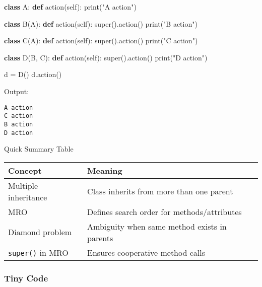 \documentclass[
  letterpaper,
  DIV=11,
  numbers=noendperiod]{scrreprt}
\newenvironment{Shaded}{\begin{snugshade}}{\end{snugshade}}
\newcommand{\BuiltInTok}[1]{\textcolor[rgb]{0.00,0.23,0.31}{#1}}
\newcommand{\KeywordTok}[1]{\textcolor[rgb]{0.00,0.23,0.31}{\textbf{#1}}}
\newcommand{\NormalTok}[1]{\textcolor[rgb]{0.00,0.23,0.31}{#1}}
\newcommand{\OperatorTok}[1]{\textcolor[rgb]{0.37,0.37,0.37}{#1}}
\newcommand{\StringTok}[1]{\textcolor[rgb]{0.13,0.47,0.30}{#1}}
\newcommand{\VariableTok}[1]{\textcolor[rgb]{0.07,0.07,0.07}{#1}}
\begin{document}
\begin{Shaded}
\begin{Highlighting}[]
\KeywordTok{class}\NormalTok{ A:}
    \KeywordTok{def}\NormalTok{ action(}\VariableTok{self}\NormalTok{):}
        \BuiltInTok{print}\NormalTok{(}\StringTok{"A action"}\NormalTok{)}

\KeywordTok{class}\NormalTok{ B(A):}
    \KeywordTok{def}\NormalTok{ action(}\VariableTok{self}\NormalTok{):}
        \BuiltInTok{super}\NormalTok{().action()}
        \BuiltInTok{print}\NormalTok{(}\StringTok{"B action"}\NormalTok{)}

\KeywordTok{class}\NormalTok{ C(A):}
    \KeywordTok{def}\NormalTok{ action(}\VariableTok{self}\NormalTok{):}
        \BuiltInTok{super}\NormalTok{().action()}
        \BuiltInTok{print}\NormalTok{(}\StringTok{"C action"}\NormalTok{)}

\KeywordTok{class}\NormalTok{ D(B, C):}
    \KeywordTok{def}\NormalTok{ action(}\VariableTok{self}\NormalTok{):}
        \BuiltInTok{super}\NormalTok{().action()}
        \BuiltInTok{print}\NormalTok{(}\StringTok{"D action"}\NormalTok{)}

\NormalTok{d }\OperatorTok{=}\NormalTok{ D()}
\NormalTok{d.action()}
\end{Highlighting}
\end{Shaded}

Output:

\begin{verbatim}
A action
C action
B action
D action
\end{verbatim}

Quick Summary Table

\begin{longtable}[]{@{}ll@{}}
\toprule\noalign{}
Concept & Meaning \\
\midrule\noalign{}
\endhead
\bottomrule\noalign{}
\endlastfoot
Multiple inheritance & Class inherits from more than one parent \\
MRO & Defines search order for methods/attributes \\
Diamond problem & Ambiguity when same method exists in parents \\
\texttt{super()} in MRO & Ensures cooperative method calls \\
\end{longtable}

\subsubsection{Tiny Code}\label{tiny-code-66}
\end{document}
